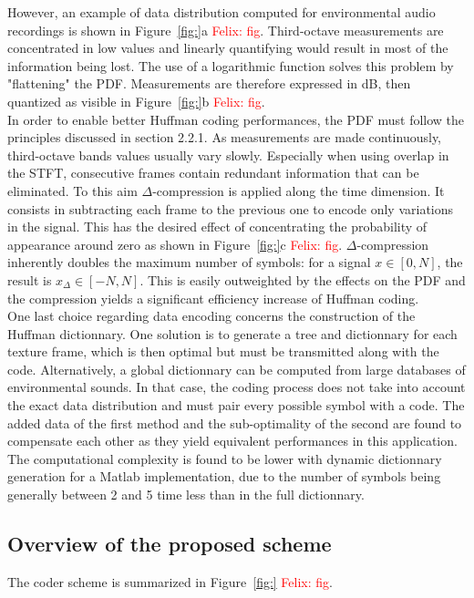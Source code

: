 \documentclass[12pt,times,onecolumn]{article}
\newcommand{\fg}[1]{\textcolor{red}{ Felix: #1}}
\begin{document}
However, an example of data distribution computed for environmental audio recordings is shown in Figure~\ref{fig:}a \fg{fig}. Third-octave measurements are concentrated in low values and linearly quantifying would result in most of the information being lost. The use of a logarithmic function solves this problem by "flattening" the PDF. Measurements are therefore expressed in dB, then quantized as visible in Figure~\ref{fig:}b\fg{fig}.\\

In order to enable better Huffman coding performances, the PDF must follow the principles discussed in section 2.2.1. As measurements are made continuously, third-octave bands values usually vary slowly. Especially when using overlap in the STFT, consecutive frames contain redundant information that can be eliminated. To this aim $\Delta$-compression is applied along the time dimension. It consists in subtracting each frame to the previous one to encode only variations in the signal. This has the desired effect of concentrating the probability of appearance around zero as shown in Figure~\ref{fig:}c\fg{fig}. $\Delta$-compression inherently doubles the maximum number of symbols: for a signal $x\in [0, N]$, the result is $x_\Delta \in [-N, N]$. This is easily outweighted by the effects on the PDF and the compression yields a significant efficiency increase of Huffman coding.\\

One last choice regarding data encoding concerns the construction of the Huffman dictionnary. One solution is to generate a tree and dictionnary for each texture frame, which is then optimal but must be transmitted along with the code. Alternatively, a global dictionnary can be computed from large databases of environmental sounds. In that case, the coding process does not take into account the exact data distribution and must pair every possible symbol with a code. The added data of the first method and the sub-optimality of the second are found to compensate each other as they yield equivalent performances in this application. The computational complexity is found to be lower with dynamic dictionnary generation for a Matlab implementation, due to the number of symbols being generally between 2 and 5 time less than in the full dictionnary.

\subsection{Overview of the proposed scheme}
The coder scheme is summarized in Figure~\ref{fig:}\fg{fig}.
\end{document}
